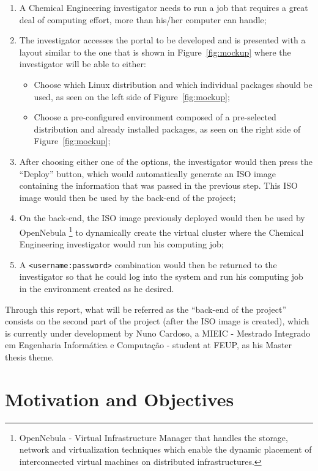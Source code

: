 \begin{enumerate}
\item A Chemical Engineering investigator needs to run a job that requires a great deal of computing effort, more than his/her computer can handle;
\item The investigator accesses the portal to be developed and is presented with a layout similar to the one that is shown in Figure~\ref{fig:mockup} where the investigator will be able to either:
	\begin{itemize}
	\item Choose which Linux distribution and which individual packages should be used, as seen on the left side of Figure~\ref{fig:mockup};
	\item Choose a pre-configured environment composed of a pre-selected distribution and already installed packages, as seen on the right side of Figure~\ref{fig:mockup};
	\end{itemize}
\item After choosing either one of the options, the investigator would then press the ``Deploy'' button, which would automatically generate an ISO image containing the information that was passed in the previous step. This ISO image would then be used by the back-end of the project;
\item On the back-end, the ISO image previously deployed would then be used by OpenNebula \footnote{OpenNebula - Virtual Infrastructure Manager that handles the storage, network and virtualization techniques which enable the dynamic placement of interconnected virtual machines on distributed infrastructures.\cite{opennebula}} to dynamically create the virtual cluster where the Chemical Engineering investigator would run his computing job;
\item A \verb,<username:password>, combination would then be returned to the investigator so that he could log into the system and run his computing job in the environment created as he desired.
\end{enumerate}

Through this report, what will be referred as the ``back-end of the project'' consists on the second part of the project (after the ISO image is created), which is currently under development by Nuno Cardoso, a MIEIC - Mestrado Integrado em Engenharia Informática e Computação - student at FEUP, as his Master thesis theme.
	

\section{Motivation and Objectives} \label{sec:goals}

